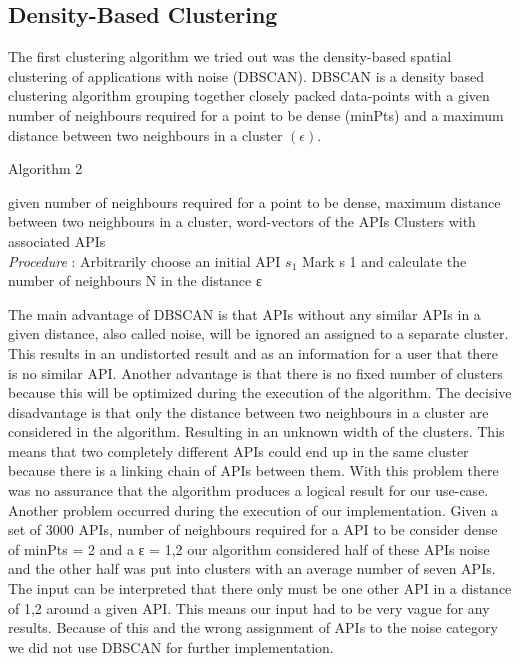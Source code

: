 \documentclass[a4paper]{IEEEtran}
\begin{document}
\subsection{Density-Based Clustering}
The first clustering algorithm we tried out was the density-based spatial clustering of applications with noise (DBSCAN). DBSCAN is a density based clustering algorithm grouping together closely packed data-points with a given number of neighbours required for a point to be dense (minPts) and a maximum distance between two neighbours in a cluster $(\epsilon)$. 

\begin{algorithm}[H]
 \caption{Algorithm 2}
 \begin{algorithmic}[1]
\renewcommand{\algorithmicrequire}{\textbf{Input:}}
 \renewcommand{\algorithmicensure}{\textbf{Output:}}
 \REQUIRE given number of neighbours required for a point to be dense, maximum distance between two
neighbours in a cluster, word-vectors of the APIs
 \ENSURE  Clusters with associated APIs
 \\ \textit{Procedure} :
  \STATE Arbitrarily choose an initial API $s_1$
 \STATE Mark s 1 and calculate the number of neighbours N in the distance ε
 \end{algorithmic}
 \end{algorithm}

The main advantage of DBSCAN is that APIs without any similar APIs in a given distance, also called noise, will be ignored an assigned to a separate cluster. This results in an undistorted result and as an information for a user that there is no similar API. 
Another advantage is that there is no fixed number of clusters because this will be optimized during the execution of the algorithm.
The decisive disadvantage is that only the distance between two neighbours in a cluster are considered in the algorithm. Resulting in an unknown width of the clusters. This means that two completely different APIs could end up in the same cluster because there is a linking chain of APIs between them. With this problem there was no assurance that the algorithm produces a logical result for our use-case.
Another problem occurred during the execution of our implementation. Given a set of 3000 APIs, number of neighbours required for a API to be consider dense of minPts = 2 and a ε = 1,2 our algorithm considered half of these APIs noise and the other half was put into clusters with an average number of seven APIs. The input can be interpreted that there only must be one other API in a distance of 1,2 around a given API. This means our input had to be very vague for any results. Because of this and the wrong assignment of APIs to the noise category we did not use DBSCAN for further implementation.
\end{document}
